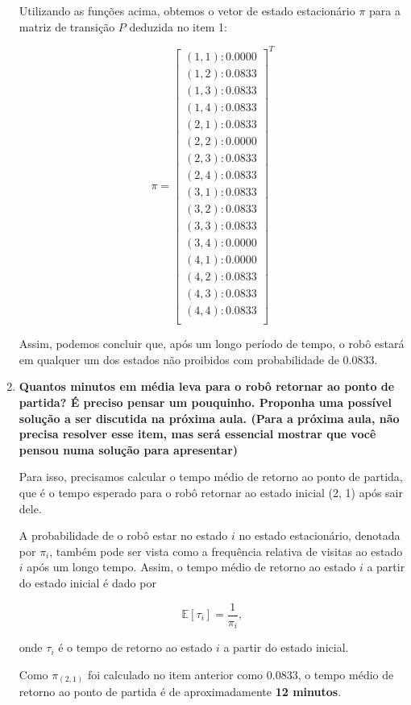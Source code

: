 \begin{enumerate}
Utilizando as funções acima, obtemos o vetor de estado estacionário \( \pi \) para a matriz de transição \( P \) deduzida no item 1:

$$
\pi = \begin{bmatrix}
    (1,1): 0.0000\\
    (1,2): 0.0833\\
    (1,3): 0.0833\\
    (1,4): 0.0833\\
    (2,1): 0.0833\\
    (2,2): 0.0000\\
    (2,3): 0.0833\\
    (2,4): 0.0833\\
    (3,1): 0.0833\\
    (3,2): 0.0833\\
    (3,3): 0.0833\\
    (3,4): 0.0000\\
    (4,1): 0.0000\\
    (4,2): 0.0833\\
    (4,3): 0.0833\\
    (4,4): 0.0833\\
\end{bmatrix}^T
$$

Assim, podemos concluir que, após um longo período de tempo, o robô estará em qualquer um dos estados não proibidos com probabilidade de \( \boldsymbol{0.0833} \).

    \item \textbf{Quantos minutos em média leva para o robô retornar ao ponto de partida? É preciso pensar um pouquinho. Proponha uma possível solução a ser discutida na próxima aula. (Para a próxima aula, não precisa resolver esse item, mas será essencial mostrar que você pensou numa solução para apresentar)}
    
    Para isso, precisamos calcular o tempo médio de retorno ao ponto de partida, que é o tempo esperado para o robô retornar ao estado inicial (2, 1) após sair dele.

    A probabilidade de o robô estar no estado \( i \) no estado estacionário, denotada por \( \pi_i \), também pode ser vista como a frequência relativa de visitas ao estado \( i \) após um longo tempo. Assim, o tempo médio de retorno ao estado \( i \) a partir do estado inicial é dado por
    
    $$ \mathbb{E}[\tau_i] = \frac{1}{\pi_i}, $$

    onde \( \tau_i \) é o tempo de retorno ao estado \( i \) a partir do estado inicial.

    Como $\pi_{(2,1)}$ foi calculado no item anterior como $0.0833$, o tempo médio de retorno ao ponto de partida é de aproximadamente \textbf{12 minutos}.

\end{enumerate}
